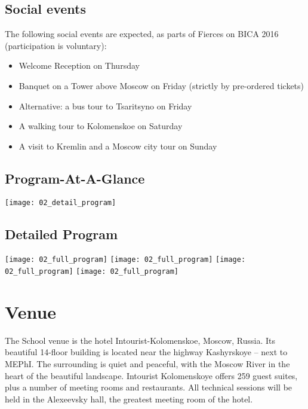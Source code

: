 \documentclass[10pt,fleqn,openany]{book} %
\begin{document}
\section{Social events}
    The following social events are expected, as parts of Fierces on BICA 2016 (participation is voluntary):
\begin{itemize}
    \item Welcome Reception on Thursday
    \item Banquet on a Tower above Moscow on Friday (strictly by pre-ordered tickets)
    \item Alternative: a bus tour to Tsaritsyno on Friday
    \item A walking tour to Kolomenskoe on Saturday
    \item A visit to Kremlin and a Moscow city tour on Sunday
\end{itemize}

\section{Program-At-A-Glance}
	\vspace{20pt}
	\texttt{[image: 02\_detail\_program]}
	\vfill
	

\section{Detailed Program}
	\texttt{[image: 02\_full\_program]}
	\texttt{[image: 02\_full\_program]}
	\texttt{[image: 02\_full\_program]}
	\texttt{[image: 02\_full\_program]}




\chapter{Venue}

The School venue is the hotel Intourist-Kolomenskoe, Moscow, Russia. Its beautiful 14-floor building is located near the highway Kashyrskoye – next to MEPhI. The surrounding is quiet and peaceful, with the Moscow River in the heart of the beautiful landscape. Intourist Kolomenskoye offers 259 guest suites, plus a number of meeting rooms and restaurants. All technical sessions will be held in the Alexeevsky hall, the greatest meeting room of the hotel.
\end{document}
